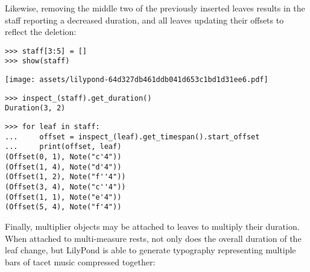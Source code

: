 \noindent Likewise, removing the middle two of the previously inserted leaves
results in the staff reporting a decreased duration, and all leaves updating
their offsets to reflect the deletion:

\begin{comment}
<abjad>
staff[3:5] = []
show(staff)
inspect_(staff).get_duration()
for leaf in staff:
    offset = inspect_(leaf).get_timespan().start_offset
    print(offset, leaf)
</abjad>
\end{comment}

\begin{abjadbookoutput}
\begin{singlespacing}
\vspace{-0.5\baselineskip}
\begin{lstlisting}
>>> staff[3:5] = []
>>> show(staff)
\end{lstlisting}
\noindent\texttt{[image: assets/lilypond-64d327db461ddb041d653c1bd1d31ee6.pdf]}
\begin{lstlisting}
>>> inspect_(staff).get_duration()
Duration(3, 2)
\end{lstlisting}
\begin{lstlisting}
>>> for leaf in staff:
...     offset = inspect_(leaf).get_timespan().start_offset
...     print(offset, leaf)
(Offset(0, 1), Note("c'4"))
(Offset(1, 4), Note("d'4"))
(Offset(1, 2), Note("f''4"))
(Offset(3, 4), Note("c''4"))
(Offset(1, 1), Note("e'4"))
(Offset(5, 4), Note("f'4"))
\end{lstlisting}
\end{singlespacing}
\end{abjadbookoutput}

\noindent Finally, multiplier objects may be attached to leaves to multiply
their duration. When attached to multi-measure rests, not only does the overall
duration of the leaf change, but LilyPond is able to generate typography
representing multiple bars of tacet music compressed together:

\begin{comment}
<abjad>
multimeasure_rest = scoretools.MultimeasureRest(1)
inspect_(multimeasure_rest).get_duration()
show(multimeasure_rest)
attach(Multiplier(4), multimeasure_rest)
inspect_(multimeasure_rest).get_duration()
show(multimeasure_rest)
</abjad>
\end{comment}

